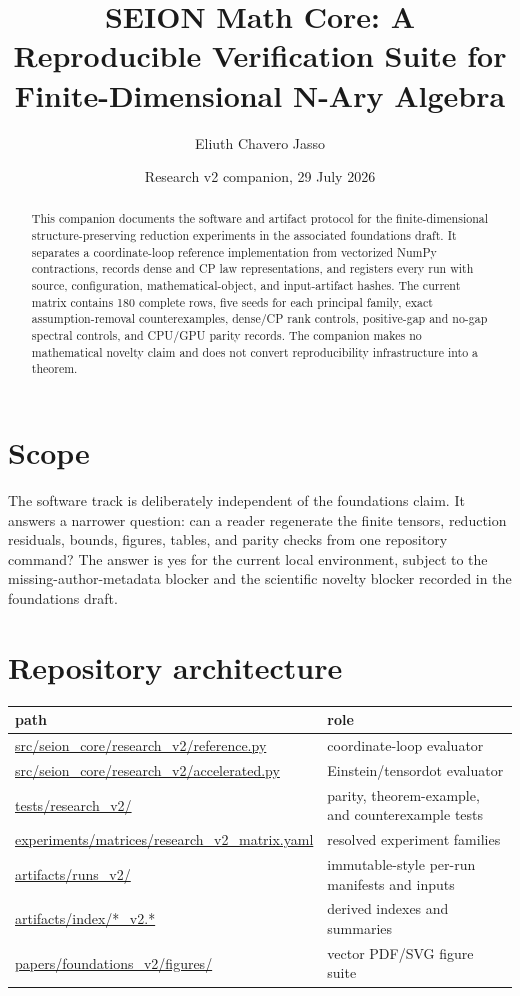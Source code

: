 \documentclass[11pt]{amsart}
\title[SEION Math Core reproducibility companion]{SEION Math Core: A Reproducible Verification Suite for Finite-Dimensional N-Ary Algebra}
\author{Eliuth Chavero Jasso}
\date{Research v2 companion, 29 July 2026}
\begin{document}
\begin{abstract}
This companion documents the software and artifact protocol for the finite-dimensional structure-preserving reduction experiments in the associated foundations draft. It separates a coordinate-loop reference implementation from vectorized NumPy contractions, records dense and CP law representations, and registers every run with source, configuration, mathematical-object, and input-artifact hashes. The current matrix contains 180 complete rows, five seeds for each principal family, exact assumption-removal counterexamples, dense/CP rank controls, positive-gap and no-gap spectral controls, and CPU/GPU parity records. The companion makes no mathematical novelty claim and does not convert reproducibility infrastructure into a theorem.
\end{abstract}
\maketitle

\section{Scope}

The software track is deliberately independent of the foundations claim. It
answers a narrower question: can a reader regenerate the finite tensors,
reduction residuals, bounds, figures, tables, and parity checks from one
repository command? The answer is yes for the current local environment,
subject to the missing-author-metadata blocker and the scientific novelty
blocker recorded in the foundations draft.

\section{Repository architecture}

\begin{center}
\small
\begin{tabular}{p{}>{\raggedright\arraybackslash}p{}}
\toprule
path & role\\
\midrule
\url{src/seion_core/research_v2/reference.py} & coordinate-loop evaluator\\
\url{src/seion_core/research_v2/accelerated.py} & Einstein/tensordot evaluator\\
\url{tests/research_v2/} & parity, theorem-example, and counterexample tests\\
\url{experiments/matrices/research_v2_matrix.yaml} & resolved experiment families\\
\url{artifacts/runs_v2/} & immutable-style per-run manifests and inputs\\
\url{artifacts/index/*_v2.*} & derived indexes and summaries\\
\url{papers/foundations_v2/figures/} & vector PDF/SVG figure suite\\
\bottomrule
\end{tabular}
\end{center}
\end{document}
